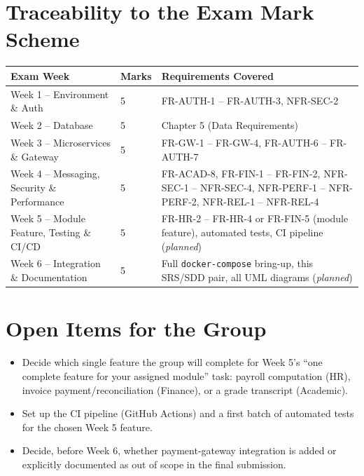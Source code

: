 \documentclass[11pt,a4paper]{report}
\begin{document}
\section{Traceability to the Exam Mark Scheme}
\begin{center}
\begin{tabular}{@{}p{3.6cm}p{4.4cm}p{6.4cm}@{}}
\toprule
\textbf{Exam Week} & \textbf{Marks} & \textbf{Requirements Covered} \\
\midrule
Week 1 -- Environment \& Auth & 5 & FR-AUTH-1 -- FR-AUTH-3, NFR-SEC-2 \\
Week 2 -- Database & 5 & Chapter 5 (Data Requirements) \\
Week 3 -- Microservices \& Gateway & 5 & FR-GW-1 -- FR-GW-4, FR-AUTH-6 -- FR-AUTH-7 \\
Week 4 -- Messaging, Security \& Performance & 5 & FR-ACAD-8, FR-FIN-1 -- FR-FIN-2, NFR-SEC-1 -- NFR-SEC-4, NFR-PERF-1 -- NFR-PERF-2, NFR-REL-1 -- NFR-REL-4 \\
Week 5 -- Module Feature, Testing \& CI/CD & 5 & FR-HR-2 -- FR-HR-4 or FR-FIN-5 (module feature), automated tests, CI pipeline (\textit{planned}) \\
Week 6 -- Integration \& Documentation & 5 & Full \texttt{docker-compose} bring-up, this SRS/SDD pair, all UML diagrams (\textit{planned}) \\
\bottomrule
\end{tabular}
\end{center}

\section{Open Items for the Group}
\begin{itemize}[itemsep=2pt]
    \item Decide which single feature the group will complete for Week 5's ``one complete feature for your assigned module'' task: payroll computation (HR), invoice payment/reconciliation (Finance), or a grade transcript (Academic).
    \item Set up the CI pipeline (GitHub Actions) and a first batch of automated tests for the chosen Week 5 feature.
    \item Decide, before Week 6, whether payment-gateway integration is added or explicitly documented as out of scope in the final submission.
\end{itemize}
\end{document}
